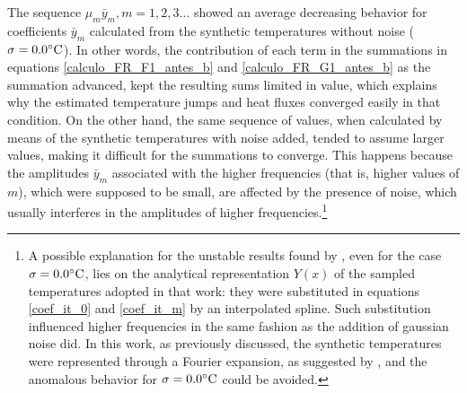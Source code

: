 \documentclass[12pt]{CHT-20}
\begin{document}
The sequence ${\mu_m\bar{y}_m, m = 1, 2, 3 \dots}$ showed an average decreasing behavior for coefficients $\bar{y}_m$ calculated from the synthetic temperatures without noise ($\sigma = 0.0\celsius$). In other words, the contribution of each term in the summations in equations \eqref{calculo_FR_F1_antes_b} and \eqref{calculo_FR_G1_antes_b} as the summation advanced, kept the resulting sums limited in value, which explains why the estimated temperature jumps and heat fluxes converged easily in that condition. On the other hand, the same sequence of values, when calculated by means of the synthetic temperatures with noise added, tended to assume larger values, making it difficult for the summations to converge. This happens because the amplitudes $\bar{y}_m$ associated with the higher frequencies (that is, higher values of $m$), which were supposed to be small, are affected by the presence of noise, which usually interferes in the amplitudes of higher frequencies.\footnote{A possible explanation for the unstable results found by \cite{artigo_padilha_3}, even for the case $\sigma = 0.0\celsius$, lies on the analytical representation $Y(x)$ of the sampled temperatures adopted in that work: they were substituted in equations \eqref{coef_it_0} and \eqref{coef_it_m} by an interpolated spline. Such substitution influenced higher frequencies in the same fashion as the addition of gaussian noise did. In this work, as previously discussed, the synthetic temperatures were represented through a Fourier expansion, as suggested by \cite{artigo_mocerino}, and the anomalous behavior for $\sigma = 0.0\celsius$ could be avoided.}
\end{document}
